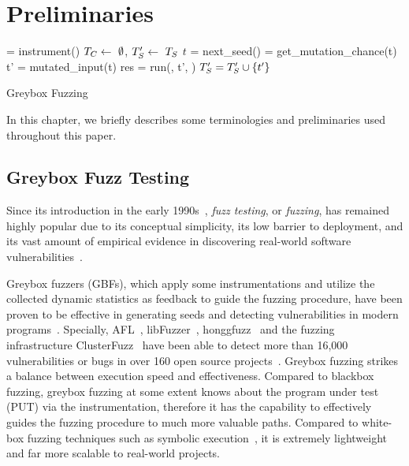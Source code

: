 \chapter{Preliminaries} \label{ch:preliminaries}

\begin{algorithm}[t]
 \small
{}
	\Prog = instrument(\ProgO) 
	$T_{C} \leftarrow~\emptyset$, $T^{\prime}_{S} \leftarrow~T_{S}$\; 
	 {
		$t$ = next\_seed(\FinalSeeds) 
		\mutChance = get\_mutation\_chance(t)  \label{line:algo:energy}
		 {
			t' = mutated\_input(t)  
			res = run(\Prog, t', \Ncal)
			 {\label{line:algo:new_cov}
				$T^{\prime}_{S} = T^{\prime}_{S}\cup\{t'\}$  \label{line:algo:triage_end}
			}
		}
	}
	\caption{Greybox Fuzzing}\label{algo:gbf}
\end{algorithm}

In this chapter, we briefly describes some terminologies and preliminaries used throughout this paper.

\section{Greybox Fuzz Testing}\label{sec:intro-gbf}
Since its introduction in the early 1990s~\cite{fuzzing1990}, \emph{fuzz testing}, or \emph{fuzzing}, has remained highly popular due to its conceptual simplicity, its low barrier to deployment, and its vast amount of empirical evidence in discovering real-world software vulnerabilities~\cite{fuzz_survey}.

Greybox fuzzers (GBFs), which apply some instrumentations and utilize the collected dynamic statistics as feedback to guide the fuzzing procedure, have been proven to be effective in generating seeds and detecting vulnerabilities in modern programs~\cite{fuzz_survey}. Specially, AFL~\cite{afl}, libFuzzer~\cite{libfuzzer}, honggfuzz~\cite{honggfuzz} and the fuzzing infrastructure ClusterFuzz~\cite{clusterfuzz} have been able to detect more than 16,000 vulnerabilities or bugs in over 160 open source projects~\cite{afl,clusterfuzz}. Greybox fuzzing strikes a balance between execution speed and effectiveness. Compared to blackbox fuzzing, greybox fuzzing at some extent knows about the program under test (PUT) via the instrumentation, therefore it has the capability to effectively guides the fuzzing procedure to much more valuable paths. Compared to white-box fuzzing techniques such as symbolic execution~\cite{dart,klee}, it is extremely lightweight and far more scalable to real-world projects.



